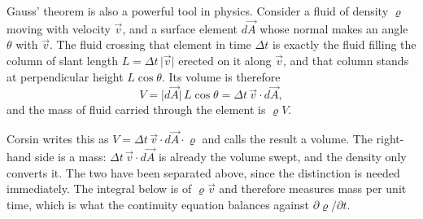 Gauss' theorem is also a powerful tool in physics. Consider a fluid of density $\varrho$ moving
with velocity $\vec v$, and a surface element $d\vec A$ whose normal makes an angle $\theta$
with $\vec v$. The fluid crossing that element in time $\Delta t$ is exactly the fluid filling
the column of slant length $L = \Delta t\,\lvert\vec v\rvert$ erected on it along $\vec v$, and
that column stands at perpendicular height $L\cos\theta$. Its volume is therefore
\[V = \lvert d\vec A\rvert\,L\cos\theta = \Delta t\,\vec v\cdot d\vec A,\]
and the mass of fluid carried through the element is $\varrho V$.

\begin{ainote}
Corsin writes this as $V = \Delta t\,\vec v\cdot d\vec A\cdot\varrho$ and calls the result a
volume. The right-hand side is a mass: $\Delta t\,\vec v\cdot d\vec A$ is already the volume
swept, and the density only converts it. The two have been separated above, since the
distinction is needed immediately. The integral below is of $\varrho\vec v$ and therefore
measures mass per unit time, which is what the continuity equation balances against
$\partial\varrho/\partial t$.
\end{ainote}

